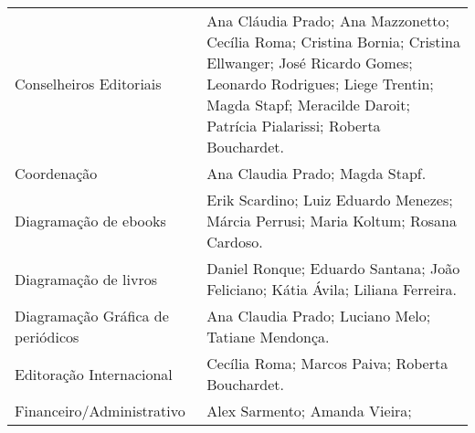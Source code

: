 \begin{longtable}[]{@{}
  >{\raggedright\arraybackslash}p{}
  >{\raggedright\arraybackslash}p{}@{}}
\begin{minipage}[b]{\linewidth}
Conselheiros Editoriais
\end{minipage} & \begin{minipage}[b]{\linewidth}\raggedright
Ana Cláudia Prado; Ana Mazzonetto; Cecília Roma; Cristina Bornia; Cristina Ellwanger; José Ricardo Gomes; Leonardo Rodrigues; Liege Trentin; Magda Stapf; Meracilde Daroit; Patrícia Pialarissi; Roberta Bouchardet.
\end{minipage} \\
\begin{minipage}[b]{\linewidth}\raggedright
Coordenação
\end{minipage} & \begin{minipage}[b]{\linewidth}\raggedright
Ana Claudia Prado; Magda Stapf.
\end{minipage} \\
\begin{minipage}[b]{\linewidth}\raggedright
Diagramação de ebooks
\end{minipage} & \begin{minipage}[b]{\linewidth}\raggedright
Erik Scardino; Luiz Eduardo Menezes; Márcia Perrusi; Maria Koltum; Rosana Cardoso.
\end{minipage} \\
\begin{minipage}[b]{\linewidth}\raggedright
Diagramação de livros
\end{minipage} & \begin{minipage}[b]{\linewidth}\raggedright
Daniel Ronque; Eduardo Santana; João Feliciano; Kátia Ávila; Liliana Ferreira.
\end{minipage} \\
\begin{minipage}[b]{\linewidth}\raggedright
Diagramação Gráfica de periódicos
\end{minipage} & \begin{minipage}[b]{\linewidth}\raggedright
Ana Claudia Prado; Luciano Melo; Tatiane Mendonça.
\end{minipage} \\
\begin{minipage}[b]{\linewidth}\raggedright
Editoração Internacional
\end{minipage} & \begin{minipage}[b]{\linewidth}\raggedright
Cecília Roma; Marcos Paiva; Roberta Bouchardet.
\end{minipage} \\
\begin{minipage}[b]{\linewidth}\raggedright
Financeiro/Administrativo
\end{minipage} & \begin{minipage}[b]{\linewidth}\raggedright
Alex Sarmento; Amanda Vieira;


\end{minipage}
\end{longtable}
